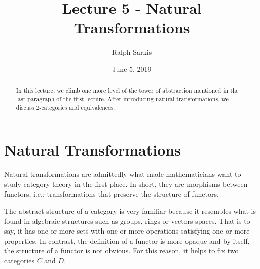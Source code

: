 \documentclass{article}
\title{Lecture 5 - Natural Transformations\vspace{-10pt}}
\author{Ralph Sarkis}
\date{\vspace{-10pt}June 5, 2019\vspace{-15pt}}  %
\theoremstyle{definition}
\theoremstyle{remark}
\begin{document}
\maketitle
\begin{abstract} In this lecture, we climb one more level of the tower of abstraction mentioned in the last paragraph of the first lecture. After introducing natural transformations, we discuss 2-categories and equivalences.
\end{abstract}
\section{Natural Transformations}
Natural transformations are admittedly what made mathematicians want to study category theory in the first place. In short, they are morphisms between functors, i.e.: transformations that preserve the structure of functors.

The abstract structure of a category is very familiar because it resembles what is found in algebraic structures such as groups, rings or vectors spaces. That is to say, it has one or more sets with one or more operations satisfying one or more properties. In contrast, the definition of a functor is more opaque and by itself, the structure of a functor is not obvious. For this reason, it helps to fix two categories $C$ and $D$. 
\end{document}
